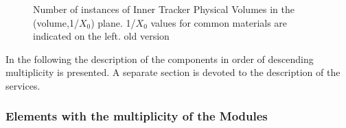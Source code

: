 \documentclass{cmspaper}
\begin{document}
\begin{figure}[hbtp]
  \begin{center}
    \caption{Number of instances of Inner Tracker Physical Volumes in
      the (volume,1/$X_0$) plane. 1/$X_0$ values for common materials are indicated on the
    left. \fixme old version}
    \label{fig:tibtid_pv_size}
  \end{center}
\end{figure}
In the following the description of the components in
order of descending multiplicity is presented. A separate section is devoted to the
description of the services.

\subsubsection{Elements with the multiplicity of the Modules}
\end{document}
